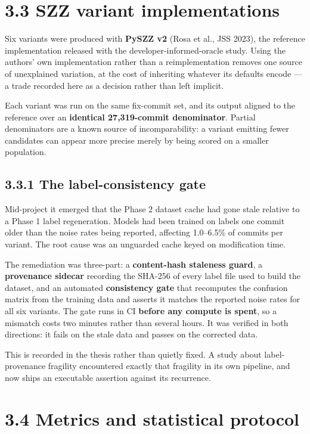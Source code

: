\section{3.3 SZZ variant
implementations}\label{szz-variant-implementations}

Six variants were produced with \textbf{PySZZ v2} (Rosa et al., JSS
2023), the reference implementation released with the
developer-informed-oracle study. Using the authors' own implementation
rather than a reimplementation removes one source of unexplained
variation, at the cost of inheriting whatever its defaults encode --- a
trade recorded here as a decision rather than left implicit.

Each variant was run on the same fix-commit set, and its output aligned
to the reference over an \textbf{identical 27,319-commit denominator}.
Partial denominators are a known source of incomparability: a variant
emitting fewer candidates can appear more precise merely by being scored
on a smaller population.

\subsection{3.3.1 The label-consistency
gate}\label{the-label-consistency-gate}

Mid-project it emerged that the Phase 2 dataset cache had gone stale
relative to a Phase 1 label regeneration. Models had been trained on
labels one commit older than the noise rates being reported, affecting
1.0--6.5\% of commits per variant. The root cause was an unguarded cache
keyed on modification time.

The remediation was three-part: a \textbf{content-hash staleness guard},
a \textbf{provenance sidecar} recording the SHA-256 of every label file
used to build the dataset, and an automated \textbf{consistency gate}
that recomputes the confusion matrix from the training data and asserts
it matches the reported noise rates for all six variants. The gate runs
in CI \textbf{before any compute is spent}, so a mismatch costs two
minutes rather than several hours. It was verified in both directions:
it fails on the stale data and passes on the corrected data.

This is recorded in the thesis rather than quietly fixed. A study about
label-provenance fragility encountered exactly that fragility in its own
pipeline, and now ships an executable assertion against its recurrence.

\section{3.4 Metrics and statistical
protocol}\label{metrics-and-statistical-protocol}

